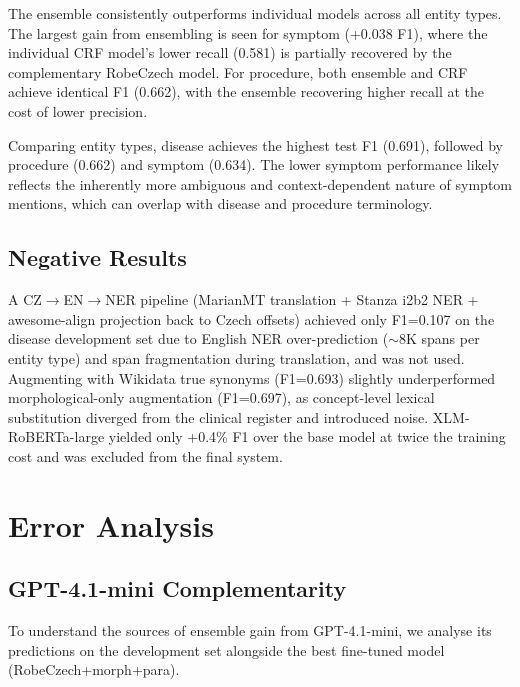 \documentclass[11pt]{article}
\begin{document}
The ensemble consistently outperforms individual models across all entity types. The
largest gain from ensembling is seen for symptom (+0.038 F1), where the individual CRF
model's lower recall (0.581) is partially recovered by the complementary RobeCzech model.
For procedure, both ensemble and CRF achieve identical F1 (0.662), with the ensemble
recovering higher recall at the cost of lower precision.

Comparing entity types, disease achieves the highest test F1 (0.691), followed by
procedure (0.662) and symptom (0.634). The lower symptom performance likely reflects
the inherently more ambiguous and context-dependent nature of symptom mentions, which
can overlap with disease and procedure terminology.

\subsection{Negative Results}

A CZ$\to$EN$\to$NER pipeline (MarianMT translation + Stanza i2b2 NER + awesome-align
projection back to Czech offsets) achieved only F1=0.107 on the disease development set
due to English NER over-prediction ($\sim$8K spans per entity type) and span fragmentation
during translation, and was not used.
Augmenting with Wikidata true synonyms (F1=0.693) slightly underperformed morphological-only
augmentation (F1=0.697), as concept-level lexical substitution diverged from the clinical
register and introduced noise.
XLM-RoBERTa-large yielded only +0.4\% F1 over the base model at twice the training cost
and was excluded from the final system.

\section{Error Analysis}

\subsection{GPT-4.1-mini Complementarity}

To understand the sources of ensemble gain from GPT-4.1-mini, we analyse its
predictions on the development set alongside the best fine-tuned model (RobeCzech+morph+para).
\end{document}
